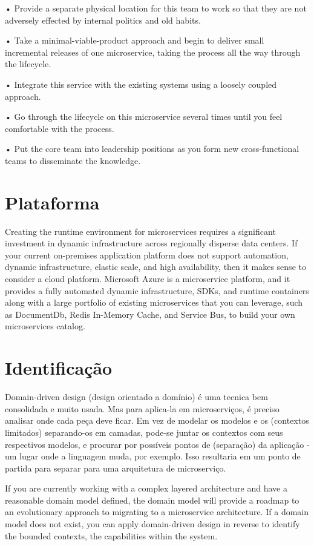 •	 Provide a separate physical location for this team to work so that they are not adversely effected by internal politics and old habits.

•	 Take a minimal-viable-product approach and begin to deliver small incremental releases of one microservice, taking the process all the way through the lifecycle.

•	 Integrate this service with the existing systems using a loosely coupled approach.

•	 Go through the lifecycle on this microservice several times until you feel comfortable with the process.

•	 Put the core team into leadership positions as you form new cross-functional teams to disseminate the knowledge.

\section*{Plataforma}

Creating the runtime environment for microservices requires a significant investment in dynamic infrastructure across regionally disperse data centers. If your current on-premises application platform does not support automation, dynamic infrastructure, elastic scale, and high availability, then it makes sense to consider a cloud platform. Microsoft Azure is a microservice platform, and it provides a fully automated dynamic infrastructure, SDKs, and runtime containers along with a large portfolio of existing microservices that you can leverage, such as DocumentDb, Redis In-Memory Cache, and Service Bus, to build your own microservices catalog.

\section{Identificação}

Domain-driven design (design orientado a domínio) é uma tecnica bem consolidada e muito usada. Mas para aplica-la em microserviços, é preciso analisar onde cada peça deve ficar. Em vez de modelar os modelos e os (contextos limitados) separando-os em camadas, pode-se juntar os contextos com seus respectivos modelos, e procurar por possíveis pontos de (separação) da aplicação - um lugar onde a linguagem muda, por exemplo. Isso resultaria em um ponto de partida para separar para uma arquitetura de microserviço.

If you are currently working with a complex layered architecture and have a reasonable domain model defined, the domain model will provide a roadmap to an evolutionary approach to migrating to a microservice architecture. If a domain model does not exist, you can apply domain-driven design in reverse to identify the bounded contexts, the capabilities within the system.

